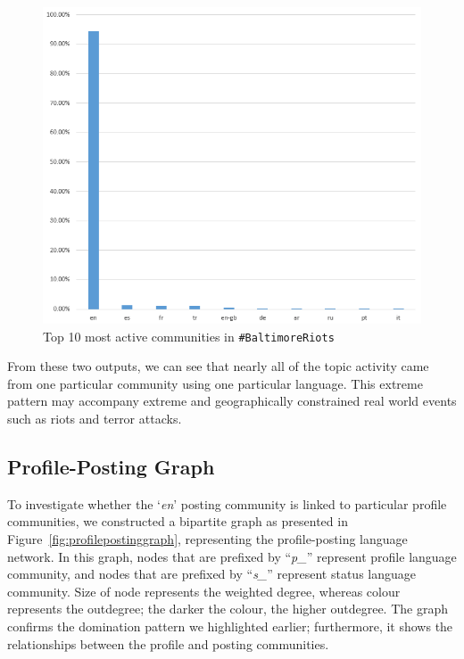 \documentclass[conference]{IEEEtran}
\begin{document}
\begin{figure}[!htb]
\centering
\includegraphics[width=\columnwidth]{images/activecomm.png}
\caption{Top 10 most active communities in {\texttt{\#BaltimoreRiots}}}
\label{fig:activecomm}
\end{figure}

From these two outputs, we can see that nearly all of the topic
activity came from one particular community using one particular
language. This extreme pattern may accompany extreme and
geographically constrained real world events such as riots and terror
attacks.


\subsection{Profile-Posting Graph}

To investigate whether the `{\emph{en}}' posting community is linked to
particular profile communities, we constructed a bipartite graph as
presented in Figure~\ref{fig:profilepostinggraph}, representing the
profile-posting language network. In this graph, nodes that are
prefixed by ``{\emph{p\_}}'' represent profile language community, and
nodes that are prefixed by ``{\emph{s\_}}'' represent status language
community. Size of node represents the weighted degree, whereas colour
represents the outdegree; the darker the colour, the higher
outdegree. The graph confirms the domination pattern we highlighted
earlier; furthermore, it shows the relationships between the profile and
posting communities. 
\end{document}
